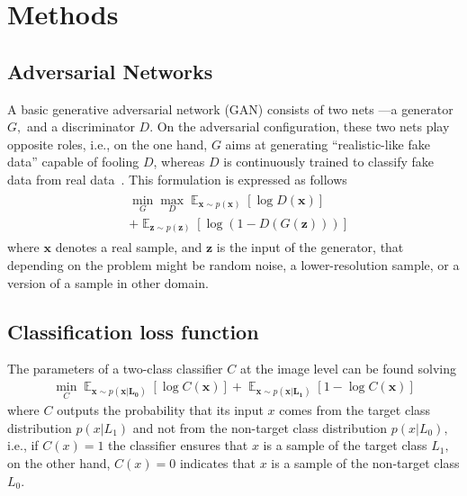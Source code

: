 \documentclass[10pt,twocolumn,letterpaper]{article}
\DeclareMathOperator*{\E}{\mathbb{E}}
\providecommand{\ve}[1]{{\bm{#1}}} %
\begin{document}

\section{Methods}
\label{sec:methods}

\subsection{Adversarial Networks}

A basic generative adversarial network (GAN) consists of two nets ---a generator $G,$ and a discriminator $D$. On the adversarial configuration, these two nets play opposite roles, i.e., on the one hand, $G$ aims at generating ``realistic-like fake data'' capable of fooling $D$, whereas $D$ is continuously trained to classify fake data from real data~\cite{Goodfellow2014}. This formulation is expressed as follows
\begin{eqnarray}
\label{eq:gan}
\begin{aligned}
& \min_G \max_D \E_{\ve{x} \sim p(\ve{x})}[\log D(\ve{x})]\\
& +\E_{\ve{z} \sim p(\ve{z})}[\log (1 - D(G(\ve{z})))]  
\end{aligned}
\end{eqnarray}
where $\ve{x}$ denotes a real sample, and $\ve{z}$ is the input of the generator, that depending on the problem might be random noise, a lower-resolution sample, or a version of a sample in other domain.

\subsection{Classification loss function}
The parameters of a two-class classifier $C$ at the image level can be found solving
\begin{eqnarray}
\label{eq:cnet}
\min_C \E_{\ve{x} \sim p(\ve{x|L_0})}[\log C(\ve{x})] +  \E_{\ve{x} \sim p(\ve{x|L_1})}[1-\log C(\ve{x})]
\end{eqnarray}
where $C$ outputs the probability that its input $x$ comes from the target class distribution $p(x|L_1)$ and not from the non-target class distribution $p(x|L_0),$ i.e., if $C(x)=1$ the classifier ensures that $x$ is a sample of the target class $L_1,$ on the other hand, $C(x)=0$ indicates that $x$ is a sample of the non-target class $L_0$.
\end{document}
